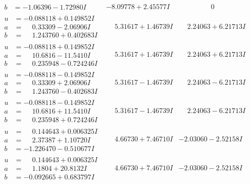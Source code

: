 \documentclass[1p]{elsarticle_modified}
\theoremstyle{definition}
\begin{document}
$$\begin{array}{c|c|c}
\begin{aligned}
b &= -1.06396 - 1.72980 I\end{aligned}
 & -8.09778 + 2.45577 I & \phantom{-0.000000 } 0 \\ \hline\begin{aligned}
u &= -0.088118 + 0.149852 I \\
a &= \phantom{-}0.33309 - 2.06906 I \\
b &= \phantom{-}1.243760 + 0.402683 I\end{aligned}
 & \phantom{-}5.31617 + 1.46739 I & \phantom{-}2.24063 + 6.21713 I \\ \hline\begin{aligned}
u &= -0.088118 + 0.149852 I \\
a &= \phantom{-}10.6816 - 11.5410 I \\
b &= \phantom{-}0.235948 - 0.724246 I\end{aligned}
 & \phantom{-}5.31617 + 1.46739 I & \phantom{-}2.24063 + 6.21713 I \\ \hline\begin{aligned}
u &= -0.088118 - 0.149852 I \\
a &= \phantom{-}0.33309 + 2.06906 I \\
b &= \phantom{-}1.243760 - 0.402683 I\end{aligned}
 & \phantom{-}5.31617 - 1.46739 I & \phantom{-}2.24063 - 6.21713 I \\ \hline\begin{aligned}
u &= -0.088118 - 0.149852 I \\
a &= \phantom{-}10.6816 + 11.5410 I \\
b &= \phantom{-}0.235948 + 0.724246 I\end{aligned}
 & \phantom{-}5.31617 - 1.46739 I & \phantom{-}2.24063 - 6.21713 I \\ \hline\begin{aligned}
u &= \phantom{-}0.144643 + 0.006325 I \\
a &= \phantom{-}2.37387 + 1.10720 I \\
b &= -1.226470 - 0.510677 I\end{aligned}
 & \phantom{-}4.66730 + 7.46710 I & -2.03060 - 2.52158 I \\ \hline\begin{aligned}
u &= \phantom{-}0.144643 + 0.006325 I \\
a &= \phantom{-}1.1804 + 20.8132 I \\
b &= -0.092665 + 0.683797 I\end{aligned}
 & \phantom{-}4.66730 + 7.46710 I & -2.03060 - 2.52158 I \\ \hline\begin{aligned}

\end{aligned}
\end{array}$$
\end{document}

